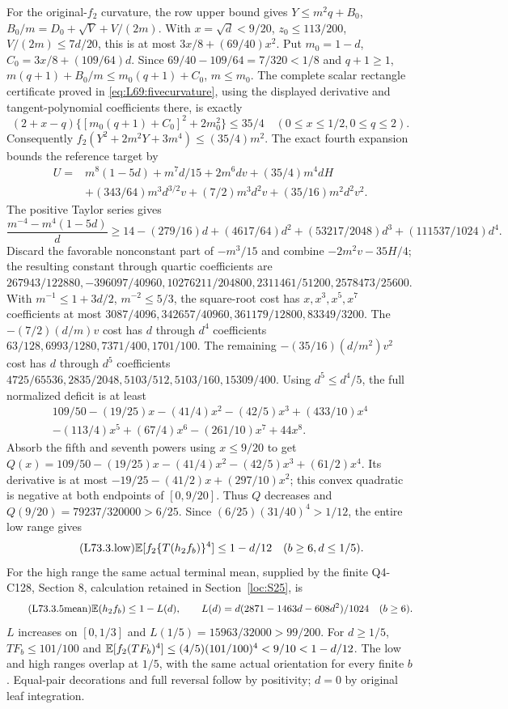 For the original-$f_2$ curvature, the row upper bound gives
$Y\le m^2q+B_0$, $B_0/m=D_0+\sqrt V+V/(2m)$.
With $x=\sqrt d<9/20$, $z_0\le113/200$, $V/(2m)\le7d/20$,
this is at most $3x/8+(69/40)x^2$.
Put $m_0=1-d$, $C_0=3x/8+(109/64)d$.
Since $69/40-109/64=7/320<1/8$ and $q+1\ge1$,
$m(q+1)+B_0/m\le m_0(q+1)+C_0$, $m\le m_0$.
The complete scalar rectangle certificate proved in
\eqref{eq:L69:fivecurvature}, using the displayed derivative and
tangent-polynomial coefficients there, is exactly
\[
(2+x-q)\{[m_0(q+1)+C_0]^2+2m_0^2\}\le35/4
\quad(0\le x\le1/2,0\le q\le2).
\]
Consequently $f_2(Y^2+2m^2Y+3m^4)\le(35/4)m^2$.
The exact fourth expansion bounds the reference target by
\begin{align*}
U={}&m^8(1-5d)+m^7d/15+2m^6dv+(35/4)m^4dH\\
&+(343/64)m^3d^{3/2}v+(7/2)m^3d^2v+(35/16)m^2d^2v^2.
\end{align*}
The positive Taylor series gives
\[
\frac{m^{-4}-m^4(1-5d)}d\ge14-(279/16)d
+(4617/64)d^2+(53217/2048)d^3+(111537/1024)d^4.
\]
Discard the favorable nonconstant part of $-m^3/15$ and combine
$-2m^2v-35H/4$; the resulting constant through quartic coefficients
are $267943/122880,\allowbreak -396097/40960,\allowbreak 10276211/204800,\allowbreak 
2311461/51200,\allowbreak 2578473/25600$.
With $m^{-1}\le1+3d/2$, $m^{-2}\le5/3$, the square-root cost has
$x,x^3,x^5,x^7$ coefficients at most
$3087/4096,\allowbreak 342657/40960,\allowbreak 361179/12800,\allowbreak 83349/3200$.
The $-(7/2)(d/m)v$ cost has $d$ through $d^4$ coefficients
$63/128,6993/1280,7371/400,1701/100$.
The remaining $-(35/16)(d/m^2)v^2$ cost has $d$ through $d^5$
coefficients $4725/65536,\allowbreak 2835/2048,\allowbreak 5103/512,\allowbreak 5103/160,\allowbreak 15309/400$.
Using $d^5\le d^4/5$, the full normalized deficit is at least
\[
\begin{gathered}
109/50-(19/25)x-(41/4)x^2-(42/5)x^3+(433/10)x^4
\\-(113/4)x^5+(67/4)x^6-(261/10)x^7+44x^8.
\end{gathered}
\]
Absorb the fifth and seventh powers using $x\le9/20$ to get
$Q(x)=109/50-(19/25)x-(41/4)x^2-(42/5)x^3+(61/2)x^4$.
Its derivative is at most
$-19/25-(41/2)x+(297/10)x^2$; this convex quadratic is negative
at both endpoints of $[0,9/20]$.
Thus $Q$ decreases and $Q(9/20)=79237/320000>6/25$.
Since $(6/25)(31/40)^4>1/12$, the entire low range gives
\begin{equation}\tag{L73.3.low}\label{eq:L73:low}
\mathbb E[f_2\{T(h_2f_b)\}^4]\le1-d/12\quad(b\ge6,d\le1/5).
\end{equation}
For the high range the same actual terminal mean, supplied by the
finite Q4-C128, Section 8, calculation retained in
Section~\ref{loc:S25}, is
\begin{equation}\tag{L73.3.5mean}\label{eq:L73:mean}
\mathbb E(h_2f_b)\le1-L(d),\qquad
L(d)=d(2871-1463d-608d^2)/1024\quad(b\ge6).
\end{equation}
$L$ increases on $[0,1/3]$ and $L(1/5)=15963/32000>99/200$.
For $d\ge1/5$, $TF_b\le101/100$ and
$\mathbb E[f_2(TF_b)^4]\le(4/5)(101/100)^4<9/10<1-d/12$.
The low and high ranges overlap at $1/5$, with the same actual
orientation for every finite $b$. Equal-pair decorations and full
reversal follow by positivity; $d=0$ by original leaf integration.
